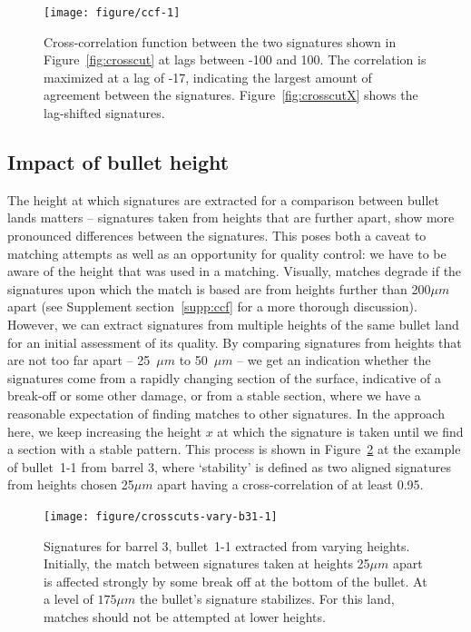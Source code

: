 \documentclass[aoas, preprint]{imsart}\usepackage[]{graphicx}\usepackage[]{color}
\newenvironment{knitrout}{}{} %
\begin{document}
\begin{figure}[hbtp]
  \centering
\begin{knitrout}
\color{fgcolor}
\texttt{[image: figure/ccf-1]} 

\end{knitrout}
\caption{\label{fig:ccf}Cross-correlation function between the two signatures shown in Figure~\ref{fig:crosscut} at lags between -100 and 100. The correlation is maximized at a lag of -17, indicating the largest amount of agreement between the signatures. Figure~\ref{fig:crosscutX} shows the lag-shifted signatures.}
\end{figure}


\subsection{Impact of bullet height}\label{sec:heights}
The height at which signatures are extracted for a comparison between bullet lands matters -- signatures taken from heights that are further apart, show more pronounced differences between the signatures. 
This poses both a caveat to matching attempts as well as an opportunity for quality control: we have to be aware of the height that was used in a matching. Visually, matches degrade if the signatures upon which the match is based are from heights further than 200$\mu m$ apart  (see Supplement section~\ref{supp:ccf} for a more thorough discussion). However, we can extract signatures from multiple heights of the same bullet land for an initial assessment of its quality. By comparing signatures from heights that are not too far apart --  25~$\mu m$ to 50~$\mu m$ -- we get an indication whether the signatures come from a rapidly changing section of the surface, indicative of a break-off or some other damage, or from a stable section, where we have a reasonable expectation of finding matches to other signatures. In the approach here, we keep increasing the height $x$ at which the signature is taken until we find a section with a stable pattern. This process is shown in Figure~\ref{fig:crosscuts2} at the example of bullet~1-1 from barrel 3, where `stability' is  defined as two aligned signatures from heights chosen 25$\mu m$ apart having a cross-correlation of at least 0.95. 

\begin{figure}[hbtp]
  \centering
\begin{knitrout}
\color{fgcolor}
\texttt{[image: figure/crosscuts-vary-b31-1]} 

\end{knitrout}
\caption{\label{fig:crosscuts2}Signatures  for barrel 3, bullet~1-1 extracted from varying heights. Initially, the match between signatures taken at heights 25$\mu m$ apart is affected strongly by some break off at the bottom of the bullet. At a  level of $175\mu m$ the bullet's signature stabilizes. For this land, matches should not be attempted at lower heights. }
\end{figure}
\end{document}

